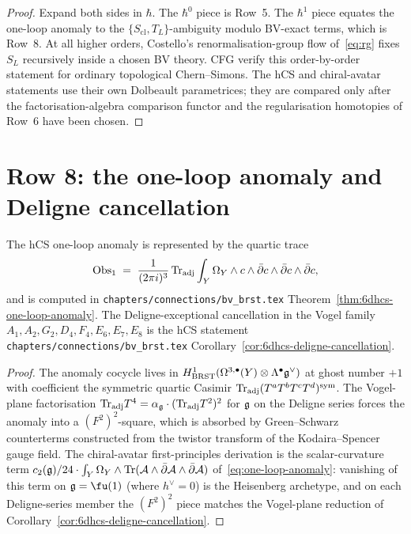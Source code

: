 \begin{proof}
Expand both sides in $\hbar$. The $\hbar^0$ piece is Row~5. The
$\hbar^1$ piece equates the one-loop anomaly to the
$\{S_{\mathrm{cl}},T_L\}$-ambiguity modulo BV-exact terms, which is
Row~8. At all higher orders, Costello's renormalisation-group flow
of~\eqref{eq:rg} fixes $S_L$ recursively inside a chosen BV theory. CFG
verify this order-by-order statement for ordinary topological
Chern--Simons. The hCS and chiral-avatar statements use their own
Dolbeault parametrices; they are compared only after the
factorisation-algebra comparison functor and the regularisation
homotopies of Row~6 have been chosen.
\end{proof}

\section{Row 8: the one-loop anomaly and Deligne cancellation}
\label{sec:cfg-row-8-anomaly}

\begin{theorem}
\label{thm:cfg-row-8}
The hCS one-loop anomaly is represented by the quartic trace
\[
 \mathrm{Obs}_1
 \;=\;
 \frac{1}{(2\pi i)^3}\,\mathrm{Tr}_{\mathrm{adj}}
 \int_Y\Omega_Y\wedge c\wedge\bar\partial c\wedge\bar\partial c\wedge\bar\partial c,
\]
and is computed in \texttt{chapters/connections/bv\_brst.tex}
Theorem~\ref{thm:6dhcs-one-loop-anomaly}. The Deligne-exceptional
cancellation in the Vogel family
$A_1, A_2, G_2, D_4, F_4, E_6, E_7, E_8$ is the hCS statement
\texttt{chapters/connections/bv\_brst.tex}
Corollary~\ref{cor:6dhcs-deligne-cancellation}.
\end{theorem}

\begin{proof}
The anomaly cocycle lives in $H^1_{\mathrm{BRST}}(\Omega^{3,\bullet}(Y)\otimes
\Lambda^\bullet\mathfrak{g}^\vee)$ at ghost number $+1$ with coefficient the
symmetric quartic Casimir
$\mathrm{Tr}_{\mathrm{adj}}(T^a T^b T^c T^d)^{\mathrm{sym}}$. The Vogel-plane
factorisation
$\mathrm{Tr}_{\mathrm{adj}}T^4 = \alpha_{\mathfrak{g}}\cdot(\mathrm{Tr}_{\mathrm{adj}}T^2)^2$ for
$\mathfrak{g}$ on the Deligne series forces the anomaly into a
$(F^2)^2$-square, which is absorbed by Green--Schwarz counterterms
constructed from the twistor transform of the
Kodaira--Spencer gauge field. The chiral-avatar first-principles
derivation is the scalar-curvature term
$c_2(\mathfrak{g})/24\cdot\int_Y\Omega_Y\wedge \mathrm{Tr}(\mathcal{A}\wedge\bar\partial\mathcal{A}\wedge\bar\partial\mathcal{A})$
of~\eqref{eq:one-loop-anomaly}: vanishing of this term on
$\fg = \fu(1)$ (where $h^\vee = 0$) is the Heisenberg
archetype, and on each Deligne-series member the $(F^2)^2$ piece
matches the Vogel-plane reduction of
Corollary~\ref{cor:6dhcs-deligne-cancellation}.
\end{proof}

